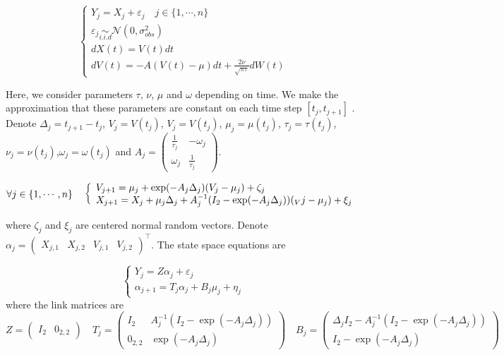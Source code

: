 \documentclass[11pt]{article}
\newcommand {\1}{\mathbb{1}}
\begin{document}
\begin{equation}  \left\{
	\begin{array}{l}
		Y_j=X_j+\varepsilon_j \quad j \in \{1,\cdots,n\}\\
		\varepsilon_j \underset{i.i.d}{\sim} \mathcal{N}(0,\sigma_{obs}^2)  \\
		dX(t)=V(t)dt  \\
		dV(t)=-A(V(t)-\mu)dt+\frac{2\nu}{\sqrt{\pi \tau}} dW(t) 
	\end{array}
	\right.
\end{equation}



Here, we consider parameters $\tau$, $\nu$, $\mu$ and $\omega$ depending on time.
We make the approximation that these parameters are constant on each time step $[t_j,t_{j+1}]$ . Denote $\Delta_j=t_{j+1}-t_j$, $V_j=V(t_j)$, $V_j=V(t_j)$, $\mu_j=\mu(t_j)$, $\tau_j=\tau(t_j)$, $\nu_j=\nu(t_j)$,$\omega_j=\omega(t_j)$ and $A_j=\begin{pmatrix} 
	\frac{1}{\tau_j} & -\omega_j \\
	\omega_j & \frac{1}{\tau_j}
\end{pmatrix}$.

\begin{equation}
	\forall j \in \{1, \cdots, n\} \quad 
	\left\{ \begin{array}{l}
		V_{j+1}=\mu_j +\exp(-A_j\Delta_j)(V_j-\mu_j)+\zeta_j \\
		X_{j+1}=X_j+\mu_j \Delta_j+A_j^{-1}(I_2-\exp(-A_j\Delta_j))(_Vj-\mu_j)+\xi_j
	\end{array}\right. \\
	\label{eq: RCVM autoregressive formula}
\end{equation}


where $\zeta_j$ and $\xi_j$ are centered normal random vectors.
Denote $\alpha_j=\begin{pmatrix} X_{j,1}  & X_{j,2} & V_{j,1} & V_{j,2}\end{pmatrix}^\top$. The state space equations are

\[
\left\{
\begin{array}{l}
	Y_j=Z\alpha_j+\varepsilon_j \\
	\alpha_{j+1}=T_j \alpha_j+B_j \mu_j + \eta_j
\end{array}
\right.\]
where the link matrices are 
\[Z=\begin{pmatrix} I_2 & 0_{2,2}\end{pmatrix} \quad  T_j=\begin{pmatrix} I_2 & A_j^{-1}(I_2-\exp(-A_j \Delta_j)) \\ 0_{2,2} & \exp(-A_j \Delta_j) \end{pmatrix} \quad B_j=\begin{pmatrix}
	\Delta_j I_2-A_j^{-1}(I_2-\exp(-A_j\Delta_j)) \\
	I_2-\exp(-A_j\Delta_j)\end{pmatrix}
\]
\end{document}
